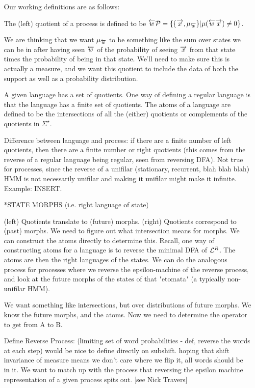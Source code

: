 \documentclass[prl,twocolumn,superscriptaddress,preprintnumbers,floatfix]{revtex4-1}
\begin{document}
Our working definitions are as follows: 

The (left) quotient of a process \Process is defined to be $\overleftarrow{w} \mathcal{P} 
= \{ \{ \overrightarrow{x}, \mu_{\overleftarrow{w}} \} | \mu(\overleftarrow{w} \overrightarrow{x}) \neq 0 \}$. 

We are thinking that we want $\mu_{\overleftarrow{w}}$ to be something like the sum over states we can be in after having seen $\overleftarrow{w}$ of the probability of seeing $\overrightarrow{x}$ from that state times the probability of being in that state.  We'll need to make sure this is actually a measure, and we want this quotient to include the data of both the support as well as a probability distribution.  

A given language \Language has a set of quotients.  One way of defining a regular language is that the language has a finite set of quotients.  The atoms of a language are defined to be the intersections of all the (either) quotients or complements of the quotients in $\Sigma^{\star}$.  

Difference between language and process: if there are a finite number of left quotients, then there are a finite number or right quotients (this comes from the reverse of a regular language being regular, seen from reversing DFA).  Not true for processes, since the reverse of a unifilar (stationary, recurrent, blah blah blah) HMM is not necessarily unifilar and making it unifilar might make it infinite. Example: INSERT.  

*STATE MORPHS (i.e. right language of state)

(left) Quotients translate to (future) morphs. (right) Quotients correspond to (past) morphs.  We need to figure out what intersection means for morphs.  We can construct the atoms directly to determine this.  Recall, one way of constructing atoms for a language \Language is to reverse the minimal DFA of $\mathcal{L}^{R}$.  The atoms are then the right languages of the states. We can do the analogous process for processes where we reverse the epsilon-machine of the reverse process, and look at the future morphs of the states of that "etomata" (a typically non-unifilar HMM).

We want something like intersections, but over distributions of future morphs.  We know the future morphs, and the atoms.  Now we need to determine the operator to get from A to B.  

Define Reverse Process: (limiting set of word probabilities - def, reverse the words at each step) would be nice to define directly on subshift. hoping that shift invariance of measure means we don't care where we flip it, all words should be in it.  We want to match up with the process that reversing the epsilon machine representation of a given process spits out. [see Nick Travers]
\end{document}
